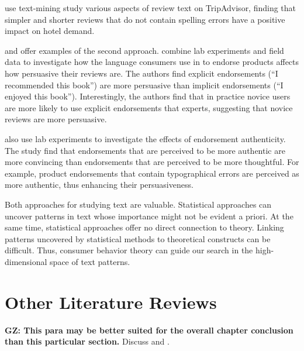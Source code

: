 \documentclass[letter,12pt]{article}
\begin{document}
\citet{ghose2012designing} use text-mining study various aspects of review
text on TripAdvisor, finding that simpler and shorter reviews that do not
contain spelling errors have a positive impact on hotel demand.

\cite{packard2017language} and \cite{kupor2017spontaneous} offer examples of
the second approach. \citet{packard2017language} combine lab experiments and
field data to investigate how the language consumers use in to endorse
products affects how persuasive their reviews are. The authors find explicit
endorsements (``I recommended this book'') are more persuasive than implicit
endorsements (``I enjoyed this book''). Interestingly, the authors find that
in practice novice users are more likely to use explicit endorsements that
experts, suggesting that novice reviews are more persuasive.

\citet{kupor2017spontaneous} also use lab experiments to investigate the
effects of endorsement authenticity. The study find that endorsements that are
perceived to be more authentic are more convincing than endorsements that are
perceived to be more thoughtful. For example, product endorsements that
contain typographical errors are perceived as more authentic, thus enhancing
their persuasiveness.

Both approaches for studying text are valuable. Statistical approaches can
uncover patterns in text whose importance might not be evident a priori. At
the same time, statistical approaches offer no direct connection to theory.
Linking patterns uncovered by statistical methods to theoretical constructs
can be difficult. Thus, consumer behavior theory can guide our search in the
high-dimensional space of text patterns.

\section{Other Literature Reviews}

\textbf{GZ: This para may be better suited for the overall chapter conclusion
than this particular section.} Discuss \citet{dellarocas2003digitization} and
\citet{luca2015user}.

\printbibliography
\end{document}
